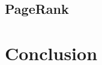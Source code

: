 \documentclass[11pt,english]{article}
\begin{document}
{    \indent 

    \subsection{PageRank}


    \section{Conclusion}
}
\end{document}
